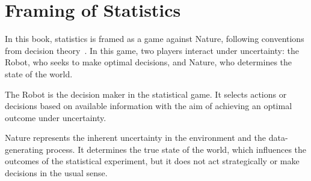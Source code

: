 \chapter{Framing of Statistics}
In this book, statistics is framed as a game against Nature, following conventions from decision theory~\cite{lavalle2006planning}. 
In this game, two players interact under uncertainty: the Robot, who seeks to make optimal decisions, and Nature, who determines the state of the world.

\begin{definition}[Robot]
	\label{def:robot}
	The Robot is the decision maker in the statistical game.
	It selects actions or decisions based on available information with the aim of achieving an optimal outcome under uncertainty.
\end{definition}

\begin{definition}[Nature]
	\label{def:nature}
	Nature represents the inherent uncertainty in the environment and the data-generating process.
	It determines the true state of the world, which influences the outcomes of the statistical experiment, but it does not act strategically or make decisions in the usual sense.
\end{definition}


